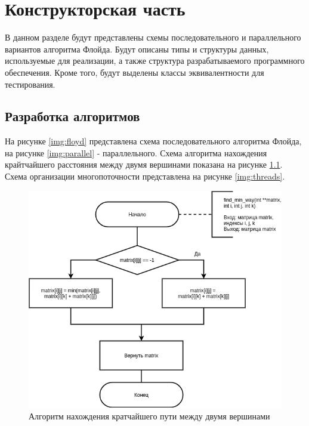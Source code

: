 \chapter{Конструкторская часть}

В данном разделе будут представлены схемы последовательного и параллельного вариантов алгоритма Флойда. Будут описаны типы и структуры данных, используемые для реализации, а также структура разрабатываемого программного обеспечения. Кроме того, будут выделены классы эквивалентности для тестирования.

\section{Разработка алгоритмов}

На рисунке \ref{img:floyd} представлена схема последовательного алгоритма Флойда, на рисунке \ref{img:parallel} - параллельного. Схема алгоритма нахождения крайтчайшего расстояния между двумя вершинами показана на рисунке \ref{img:min}. Схема организации многопоточности представлена на рисунке \ref{img:threads}.

\begin{figure}[H]
	\begin{center}
		\includegraphics[scale=0.6]{img/min.png}
	\end{center}
	\captionsetup{justification=centering}
	\caption{Алгоритм нахождения кратчайшего пути между двумя вершинами}
	\label{img:min}
\end{figure}

